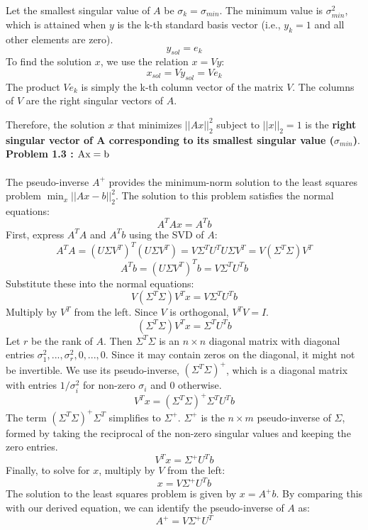 Let the smallest singular value of $A$ be $\sigma_k = \sigma_{min}$. The minimum value is $\sigma_{min}^2$, which is attained when $y$ is the k-th standard basis vector (i.e., $y_k=1$ and all other elements are zero).
$$ y_{sol} = e_k $$
To find the solution $x$, we use the relation $x=Vy$:
$$ x_{sol} = V y_{sol} = V e_k $$
The product $Ve_k$ is simply the k-th column vector of the matrix $V$. The columns of $V$ are the right singular vectors of $A$.

Therefore, the solution $x$ that minimizes $||Ax||_2^2$ subject to $||x||_2=1$ is the \textbf{right singular vector of A corresponding to its smallest singular value ($\sigma_{min}$)}.
\\

\noindent\textbf{Problem 1.3 : $\rm{A} \rm{x} = b$} \\
\\
The pseudo-inverse $A^+$ provides the minimum-norm solution to the least squares problem $\min_x ||Ax - b||_2^2$. The solution to this problem satisfies the normal equations:
$$ A^T A x = A^T b $$
First, express $A^T A$ and $A^T b$ using the SVD of $A$:
$$ A^T A = (U\Sigma V^T)^T (U\Sigma V^T) = V \Sigma^T U^T U \Sigma V^T = V(\Sigma^T \Sigma)V^T $$
$$ A^T b = (U\Sigma V^T)^T b = V \Sigma^T U^T b $$
Substitute these into the normal equations:
$$ V(\Sigma^T \Sigma)V^T x = V \Sigma^T U^T b $$
Multiply by $V^T$ from the left. Since $V$ is orthogonal, $V^T V = I$.
$$ (\Sigma^T \Sigma)V^T x = \Sigma^T U^T b $$
Let $r$ be the rank of $A$. Then $\Sigma^T \Sigma$ is an $n \times n$ diagonal matrix with diagonal entries $\sigma_1^2, ..., \sigma_r^2, 0, ..., 0$. Since it may contain zeros on the diagonal, it might not be invertible. We use its pseudo-inverse, $(\Sigma^T \Sigma)^+$, which is a diagonal matrix with entries $1/\sigma_i^2$ for non-zero $\sigma_i$ and 0 otherwise.
$$ V^T x = (\Sigma^T \Sigma)^+ \Sigma^T U^T b $$
The term $(\Sigma^T \Sigma)^+ \Sigma^T$ simplifies to $\Sigma^+$. $\Sigma^+$ is the $n \times m$ pseudo-inverse of $\Sigma$, formed by taking the reciprocal of the non-zero singular values and keeping the zero entries.
$$ V^T x = \Sigma^+ U^T b $$
Finally, to solve for $x$, multiply by $V$ from the left:
$$ x = V \Sigma^+ U^T b $$
The solution to the least squares problem is given by $x = A^+ b$. By comparing this with our derived equation, we can identify the pseudo-inverse of $A$ as:
$$ A^+ = V \Sigma^+ U^T $$